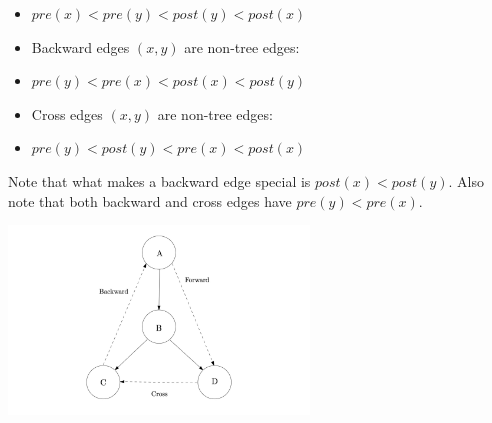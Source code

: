 \documentclass[12pt]{article}
\begin{document}
\begin{itemize}
\begin{itemize}
        \item[] $pre(x) < pre(y) < post(y) < post(x)$
        \item Backward edges $(x, y)$ are non-tree edges:
        \item[] $pre(y) < pre(x) < post(x) < post(y)$
        \item Cross edges $(x, y)$ are non-tree edges:
        \item[] $pre(y) < post(y) < pre(x) < post(x)$
    \end{itemize}
    \item Note that what makes a backward edge special is $post(x) < post(y)$. Also note that both backward and cross edges have $pre(y) < pre(x)$.
    \begin{center}
        \item[] \includegraphics[width=0.6\textwidth]{images/types-of edges.jpg}
    \end{center}
\end{itemize}
\end{document}
